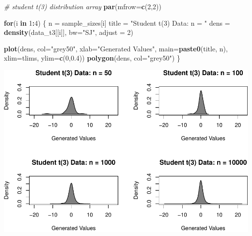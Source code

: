 \documentclass[9pt,letter]{article}
\newenvironment{Shaded}{\begin{snugshade}}{\end{snugshade}}
\newcommand{\KeywordTok}[1]{\textcolor[rgb]{0.13,0.29,0.53}{\textbf{#1}}}
\newcommand{\DataTypeTok}[1]{\textcolor[rgb]{0.13,0.29,0.53}{#1}}
\newcommand{\DecValTok}[1]{\textcolor[rgb]{0.00,0.00,0.81}{#1}}
\newcommand{\FloatTok}[1]{\textcolor[rgb]{0.00,0.00,0.81}{#1}}
\newcommand{\StringTok}[1]{\textcolor[rgb]{0.31,0.60,0.02}{#1}}
\newcommand{\CommentTok}[1]{\textcolor[rgb]{0.56,0.35,0.01}{\textit{#1}}}
\newcommand{\ControlFlowTok}[1]{\textcolor[rgb]{0.13,0.29,0.53}{\textbf{#1}}}
\newcommand{\OperatorTok}[1]{\textcolor[rgb]{0.81,0.36,0.00}{\textbf{#1}}}
\newcommand{\NormalTok}[1]{#1}
\begin{document}
\begin{Shaded}
\begin{Highlighting}[]
\CommentTok{# student t(3) distribution array}
\KeywordTok{par}\NormalTok{(}\DataTypeTok{mfrow=}\KeywordTok{c}\NormalTok{(}\DecValTok{2}\NormalTok{,}\DecValTok{2}\NormalTok{))}

\ControlFlowTok{for}\NormalTok{(i }\ControlFlowTok{in} \DecValTok{1}\OperatorTok{:}\DecValTok{4}\NormalTok{) \{}
\NormalTok{  n =}\StringTok{ }\NormalTok{sample_sizes[i]}
\NormalTok{  title =}\StringTok{ "Student t(3) Data: n = "}
\NormalTok{  dens =}\StringTok{ }\KeywordTok{density}\NormalTok{(data_t3[[i]], }\DataTypeTok{bw=}\StringTok{"SJ"}\NormalTok{, }\DataTypeTok{adjust =} \DecValTok{2}\NormalTok{)}
    
  \KeywordTok{plot}\NormalTok{(dens, }\DataTypeTok{col=}\StringTok{"grey50"}\NormalTok{,}
       \DataTypeTok{xlab=}\StringTok{"Generated Values"}\NormalTok{,}
       \DataTypeTok{main=}\KeywordTok{paste0}\NormalTok{(title, n),}
       \DataTypeTok{xlim=}\NormalTok{tlims, }\DataTypeTok{ylim=}\KeywordTok{c}\NormalTok{(}\DecValTok{0}\NormalTok{,}\FloatTok{0.4}\NormalTok{))}
  \KeywordTok{polygon}\NormalTok{(dens, }\DataTypeTok{col=}\StringTok{"grey50"}\NormalTok{)}
\NormalTok{\}}
\end{Highlighting}
\end{Shaded}

\includegraphics{a3_solutions_files/figure-latex/unnamed-chunk-9-2.pdf}
\end{document}
